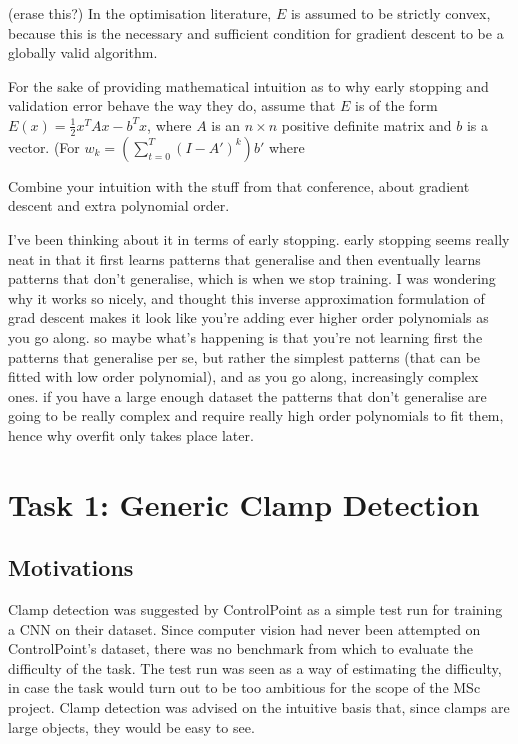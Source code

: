 \documentclass[a4paper,11pt]{article}
\begin{document}
(erase this?) In the optimisation literature, $E$ is assumed to be strictly convex, because this is the necessary and sufficient condition for gradient descent to be a globally valid algorithm. 

For the sake of providing mathematical intuition as to why early stopping and validation error behave the way they do, assume that $E$ is of the form $E(x) = \frac{1}{2}x^T Ax - b^T x$, where $A$ is an $n \times n$ positive definite matrix and $b$ is a vector. (For 
$ w_k = ( \sum_{t=0}^{T} (I - A')^k)b'$ where 


Combine your intuition with the stuff from that conference, about gradient descent and extra polynomial order.

I've been thinking about it in terms of early stopping. early stopping seems really neat in that it first learns patterns that generalise and then eventually learns patterns that don't generalise, which is when we stop training. I was wondering why  it works so nicely, and thought this inverse approximation formulation of grad descent makes it look like you're adding ever higher order polynomials as you go along. so maybe what's happening is that you're not learning first the patterns that generalise per se, but rather the simplest patterns (that can be fitted with low order polynomial), and as you go along, increasingly complex ones. if you have a large enough dataset the patterns that don't generalise are going to be really complex and require really high order polynomials to fit them, hence why overfit only takes place later.

\clearpage

\section{Task 1: Generic Clamp Detection}

\subsection{Motivations}

Clamp detection was suggested by ControlPoint as a simple test run for training a CNN on their dataset. Since computer vision had never been attempted on ControlPoint's dataset, there was no benchmark from which to evaluate the difficulty of the task. The test run was seen as a way of estimating the difficulty, in case the task would turn out to be too ambitious for the scope of the MSc project. Clamp detection was advised on the intuitive basis that, since clamps are large objects, they would be easy to see. 
\end{document}
